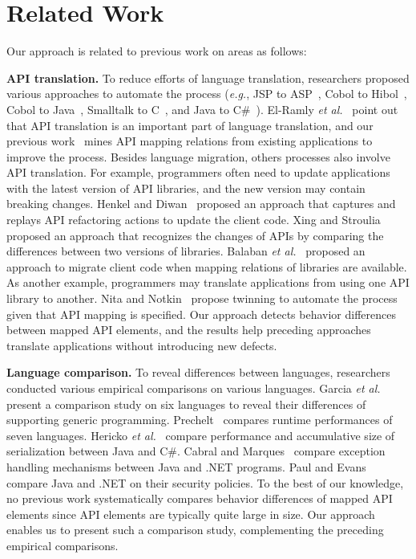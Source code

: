 \section{Related Work}
\label{sec:related}

Our approach is related to previous work on areas as follows:

\textbf{API translation.} To reduce efforts of language translation, researchers proposed various
approaches to automate the process (\emph{e.g.}, JSP to ASP~\cite{hassan2005lightweight}, Cobol to Hibol~\cite{waters1988program}, Cobol to Java~\cite{mossienko2003automated}, Smalltalk to C~\cite{yasumatsu1995spice}, and Java to C\#~\cite{el2006experiment}). El-Ramly \emph{et al.}~\cite{el2006experiment} point out that API translation is an important part of language translation, and our previous work~\cite{zhong2010mining} mines API mapping relations from existing applications to improve the process. Besides language migration, others processes also involve API translation. For example, programmers often need to update applications with the latest version of API libraries, and the new version may contain breaking changes. Henkel and Diwan~\cite{henkel2005catchup} proposed an approach that captures and replays API refactoring actions to update the client code. Xing and Stroulia~\cite{xing2007api} proposed an approach that recognizes the changes of APIs by comparing the differences between two versions of libraries. Balaban \emph{et al.}~\cite{balaban2005refactoring} proposed an approach to migrate client code when mapping relations of libraries are available. As another example, programmers may translate applications from using one API library to another. Nita and Notkin~\cite{nita2010using} propose twinning to automate the process given that API mapping is specified. Our approach detects behavior differences between mapped API elements, and the results help preceding approaches translate applications without introducing new defects.

\textbf{Language comparison.} To reveal differences between languages, researchers conducted various empirical comparisons on various languages. Garcia \emph{et al.}~\cite{Garcia2003} present a comparison study on six languages to reveal their differences of supporting generic programming. Prechelt~\cite{prechelt2000empirical} compares runtime performances of seven languages. Hericko \emph{et al.}~\cite{944589} compare performance and accumulative size of serialization between Java and C\#. Cabral and Marques~\cite{cabral2007exception} compare exception handling mechanisms between Java and .NET programs. Paul and Evans~\cite{paul2006comparing} compare Java and .NET on their security policies. To the best of our knowledge, no previous work systematically compares behavior differences of mapped API elements since API elements are typically quite large in size. Our approach enables us to present such a comparison study, complementing the preceding empirical comparisons.

